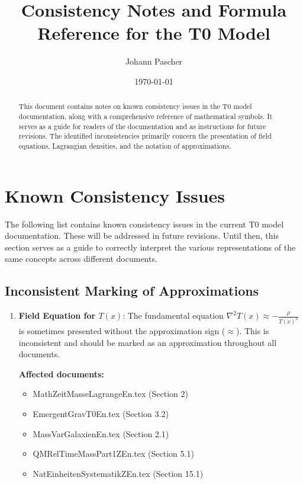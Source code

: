 \documentclass[12pt,a4paper]{article}
\title{Consistency Notes and Formula Reference for the T0 Model}
\author{Johann Pascher}
\date{\today}
\newcommand{\Tfield}{T(x)}
\begin{document}
	
	\maketitle
	
	\begin{abstract}
		This document contains notes on known consistency issues in the T0 model documentation, along with a comprehensive reference of mathematical symbols. It serves as a guide for readers of the documentation and as instructions for future revisions. The identified inconsistencies primarily concern the presentation of field equations, Lagrangian densities, and the notation of approximations.
	\end{abstract}
	
	\tableofcontents
	\newpage
	
	\section{Known Consistency Issues}
	
	\begin{tcolorbox}[colback=yellow!5!white,colframe=yellow!75!black,title=Note to Readers]
		The following list contains known consistency issues in the current T0 model documentation. These will be addressed in future revisions. Until then, this section serves as a guide to correctly interpret the various representations of the same concepts across different documents.
	\end{tcolorbox}
	
	\subsection{Inconsistent Marking of Approximations}
	
	\begin{enumerate}[label=\textbf{P\arabic*.}]
		\item \textbf{Field Equation for $\Tfield$}: The fundamental equation $\nabla^2\Tfield \approx -\frac{\rho}{\Tfield^2}$ is sometimes presented without the approximation sign ($\approx$). This is inconsistent and should be marked as an approximation throughout all documents.
		
		\textbf{Affected documents:}
		\begin{itemize}
			\item MathZeitMasseLagrangeEn.tex (Section 2)
			\item EmergentGravT0En.tex (Section 3.2)
			\item MassVarGalaxienEn.tex (Section 2.1)
			\item QMRelTimeMassPart1ZEn.tex (Section 5.1)
			\item NatEinheitenSystematikZEn.tex (Section 15.1)
		\end{itemize}
	\end{enumerate}
	
\end{document}
